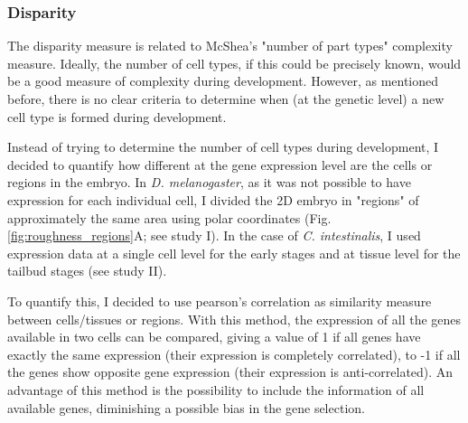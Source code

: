 \subsubsection{Disparity}

The disparity measure is related to  McShea's "number of part types" complexity measure. Ideally, the number of cell types, if this could be precisely known, would be a good measure of complexity during development. However, as mentioned before, there is no clear criteria to determine when (at the genetic level) a new cell type is formed during development.

 
Instead of trying to determine the number of cell types during development, I decided to quantify how different at the gene expression level are the cells or regions in the embryo. In \textit{D. melanogaster}, as it was not possible to have expression for each individual cell, I divided the 2D embryo in "regions" of approximately the same area using polar coordinates (Fig. \ref{fig:roughness_regions}A; see study I). 
In the case of \textit{C. intestinalis}, I used expression data at a single cell level for the early stages and at tissue level for the tailbud stages (see study II).

To quantify this, I decided to use pearson's correlation as similarity measure between cells/tissues or regions. With this method, the expression of all the genes available in two cells can be compared, giving a value of 1 if all genes have exactly the same expression (their expression is completely correlated), to -1 if all the genes show opposite gene expression (their expression is anti-correlated). 
An advantage of this method is the possibility to include the information of all available genes, diminishing a possible bias in the gene selection. 

